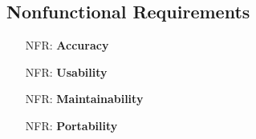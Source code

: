 \documentclass[12pt]{article}
\newcounter{nfrnum} %
\begin{document}

\subsection{Nonfunctional Requirements}



\noindent \begin{itemize}

\item[NFR\refstepcounter{nfrnum}\thenfrnum \label{NFR_Accuracy}:]
  \textbf{Accuracy}

\item[NFR\refstepcounter{nfrnum}\thenfrnum \label{NFR_Usability}:] \textbf{Usability}

\item[NFR\refstepcounter{nfrnum}\thenfrnum \label{NFR_Maintainability}:]
  \textbf{Maintainability} 

\item[NFR\refstepcounter{nfrnum}\thenfrnum \label{NFR_Portability}:]
  \textbf{Portability} 


\end{itemize}
\end{document}
